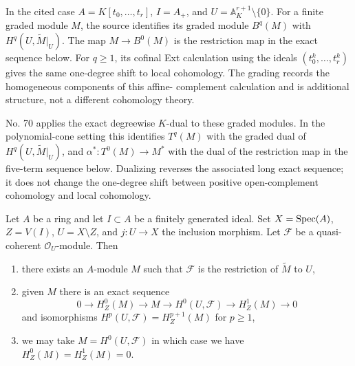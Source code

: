\begin{lemma}
\label{lemma-local-cohomology}
\begin{reference}
\cite[Chapter III, \S 4, no. 69, definition of $B^q(M)$, the map
$\alpha$, and Remark, pp. 262--263]{FAC}
\cite[Chapter III, \S 4, no. 70, definition of $T^q(M)$ and the map
$\alpha^*$, pp. 263--264]{FAC}
\end{reference}
\begin{history}
In the cited case $A=K[t_0,\ldots,t_r]$, $I=A_+$, and
$U=\mathbb A_K^{r+1}\setminus\{0\}$. For a finite graded module $M$, the
source identifies its graded module $B^q(M)$ with
$H^q(U,\widetilde M|_U)$. The map $M\to B^0(M)$ is the restriction map in
the exact sequence below. For $q\geq1$, its cofinal Ext calculation using
the ideals $(t_0^k,\ldots,t_r^k)$ gives the same one-degree shift to local
cohomology. The grading records the homogeneous components of this affine-
complement calculation and is additional structure, not a different
cohomology theory.

No. 70 applies the exact degreewise $K$-dual to these graded modules. In
the polynomial-cone setting this identifies $T^q(M)$ with the graded dual
of $H^q(U,\widetilde M|_U)$, and $\alpha^*:T^0(M)\to M^*$ with the dual of
the restriction map in the five-term sequence below. Dualizing reverses
the associated long exact sequence; it does not change the one-degree
shift between positive open-complement cohomology and local cohomology.
\end{history}
Let $A$ be a ring and let $I \subset A$ be a finitely generated ideal.
Set $X = \mathop{\mathrm{Spec}}(A)$, $Z = V(I)$, $U = X \setminus Z$, and $j : U \to X$
the inclusion morphism. Let $\mathcal{F}$ be a quasi-coherent
$\mathcal{O}_U$-module. Then
\begin{enumerate}
\item there exists an $A$-module $M$ such that $\mathcal{F}$ is the
restriction of $\widetilde{M}$ to $U$,
\item given $M$ there is an exact sequence
$$
0 \to H^0_Z(M) \to M \to H^0(U, \mathcal{F}) \to H^1_Z(M) \to 0
$$
and isomorphisms $H^p(U, \mathcal{F}) = H^{p + 1}_Z(M)$ for $p \geq 1$,
\item we may take $M = H^0(U, \mathcal{F})$ in which case
we have $H^0_Z(M) = H^1_Z(M) = 0$.
\end{enumerate}
\end{lemma}

